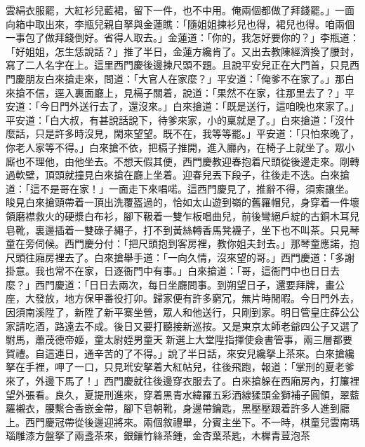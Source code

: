\begin{showcontents}{}
雲絹衣服罷，大紅衫兒藍裙，留下一件，也不中用。俺兩個都做了拜錢罷。」一面向箱中取出來，李瓶兒親自拏與金蓮瞧：「隨姐姐揀衫兒也得，裙兒也得。咱兩個一事包了做拜錢倒好。省得人取去。」金蓮道：「你的，我怎好要你的？」李瓶道：「好姐姐，怎生恁說話？」推了半日，金蓮方纔肯了。又出去教陳經濟換了腰封，寫了二人名字在上。這里西門慶後邊揀尺頭不題。且說平安兒正在大門首，只見西門慶朋友白來搶走來，問道：「大官人在家麼？」平安道：「俺爹不在家了。」那白來搶不信，逕入裏面廳上，見槅子關着，說道：「果然不在家，往那里去了？」平安道：「今日門外送行去了，還沒來。」白來搶道：「既是送行，這咱晚也來家了。」平安道：「白大叔，有甚說話說下，待爹來家，小的稟就是了。」白來搶道：「沒什麼話，只是許多時沒見，閑來望望。既不在，我等等罷。」平安道：「只怕來晚了，你老人家等不得。」白來搶不依，把槅子推開，進入廳內，在椅子上就坐了。眾小廝也不理他，由他坐去。不想天假其便，西門慶教迎春抱着尺頭從後邊走來。剛轉過軟壁，頂頭就撞見白來搶在廳上坐着。迎春兒丟下段子，往後走不迭。白來搶道：「這不是哥在家！」一面走下來唱喏。這西門慶見了，推辭不得，須索讓坐。睃見白來搶頭帶着一頂出洗覆盔過的，恰如太山遊到嶺的舊羅帽兒，身穿着一件壞領磨襟救火的硬漿白布衫，腳下靸着一雙乍板唱曲兒，前後彎絕戶綻的古銅木耳兒皂靴，裏邊插着一雙碌子繩子，打不到黃絲轉香馬凳襪子，坐下也不叫茶。只見琴童在旁伺候。西門慶分付：「把尺頭抱到客房裡，教你姐夫封去。」那琴童應諾，抱尺頭往廂房裡去了。白來搶舉手道：「一向久情，沒來望的哥。」西門慶道：「多謝掛意。我也常不在家，日逐衙門中有事。」白來搶道：「哥，這衙門中也日日去麼？」西門慶道：「日日去兩次，每日坐廳問事。到朔望日子，還要拜牌，畫公座，大發放，地方保甲番役打卯。歸家便有許多窮冗，無片時閒暇。今日門外去，因須南溪陞了，新陞了新平寨坐營，眾人和他送行，只剛到家。明日管皇庄薛公公家請吃酒，路遠去不成。後日又要打聽接新巡按。又是東京太師老爺四公子又選了駙馬，蕭茂德帝姬，童太尉姪男童天新選上大堂陞指揮使僉書管事，兩三層都要賀禮。自這連日，通辛苦的了不得。」說了半日話，來安兒纔拏上茶來。白來搶纔拏在手裡，呷了一口，只見玳安拏着大紅帖兒，往後飛跑，報道：「掌刑的夏老爹來了，外邊下馬了！」西門慶就往後邊穿衣服去了。白來搶躲在西廂房內，打簾裡望外張看。良久，夏提刑進來，穿着黑青水緯羅五彩洒線猱頭金獅補子圓領，翠藍羅襯衣，腰繫合香嵌金帶，腳下皂朝靴，身邊帶鑰匙，黑壓壓跟着許多人進到廳上。西門慶冠帶從後邊迎將來。兩個敘禮畢，分賓主坐下。不一時，棋童兒雲南瑪瑙雕漆方盤拏了兩盞茶來，銀鑲竹絲茶鍾，金杏葉茶匙，木樨青荳泡茶 
\end{showcontents}
